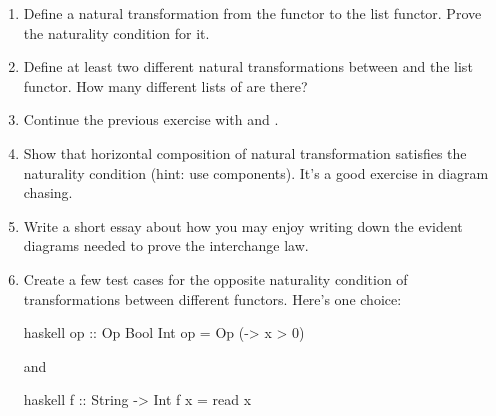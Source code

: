 \begin{enumerate}
  \tightlist
  \item
        Define a natural transformation from the  functor to the
        list functor. Prove the naturality condition for it.
  \item
        Define at least two different natural transformations between
         and the list functor. How many different lists of
        \code{()} are there?
  \item
        Continue the previous exercise with  and
        .
  \item
        Show that horizontal composition of natural transformation satisfies
        the naturality condition (hint: use components). It's a good exercise
        in diagram chasing.
  \item
        Write a short essay about how you may enjoy writing down the evident
        diagrams needed to prove the interchange law.
  \item
        Create a few test cases for the opposite naturality condition of
        transformations between different  functors. Here's one
        choice:

        \begin{snip}{haskell}
op :: Op Bool Int
op = Op (\x -> x > 0)
\end{snip}
        and

        \begin{snip}{haskell}
f :: String -> Int
f x = read x
\end{snip}
\end{enumerate}
